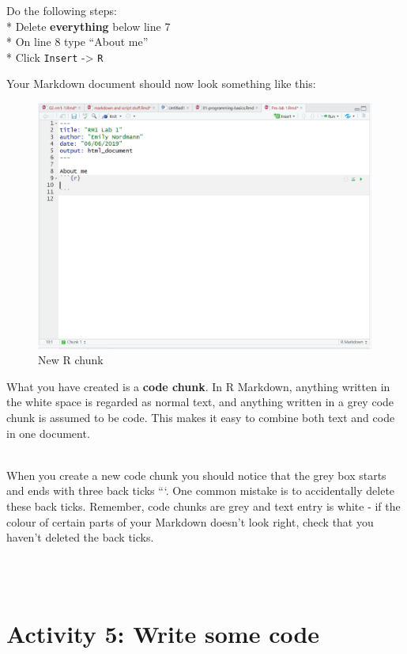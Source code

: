 \documentclass[]{book}
\newenvironment{warning}
    {
    \hline\\
    }
    { 
    \\\\\hline
    }
\begin{document}
Do the following steps:\\
* Delete \textbf{everything} below line 7\\
* On line 8 type ``About me''\\
* Click \texttt{Insert} -\textgreater{} \texttt{R}

Your Markdown document should now look something like this:

\begin{figure}

{\centering \includegraphics[width=1\linewidth]{images/new-chunk} 

}

\caption{New R chunk}\label{fig:img-new-chunk}
\end{figure}

What you have created is a \textbf{code chunk}. In R Markdown, anything written in the white space is regarded as normal text, and anything written in a grey code chunk is assumed to be code. This makes it easy to combine both text and code in one document.

\begin{warning}
When you create a new code chunk you should notice that the grey box
starts and ends with three back ticks ```. One common mistake is to
accidentally delete these back ticks. Remember, code chunks are grey and
text entry is white - if the colour of certain parts of your Markdown
doesn't look right, check that you haven't deleted the back ticks.
\end{warning}

\hypertarget{activity-5-write-some-code}{%
\section{Activity 5: Write some code}\label{activity-5-write-some-code}}
\end{document}
